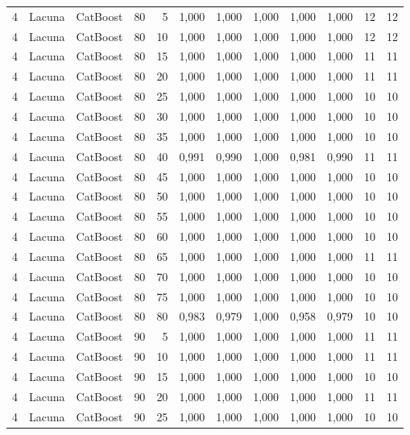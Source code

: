 \begin{longtable}{@{}rllrrrrrrrrr@{}}
4 & Lacuna & CatBoost & 80 & 5 & 1,000 & 1,000 & 1,000 & 1,000 & 1,000 & 12 & 12 \\
4 & Lacuna & CatBoost & 80 & 10 & 1,000 & 1,000 & 1,000 & 1,000 & 1,000 & 12 & 12 \\
4 & Lacuna & CatBoost & 80 & 15 & 1,000 & 1,000 & 1,000 & 1,000 & 1,000 & 11 & 11 \\
4 & Lacuna & CatBoost & 80 & 20 & 1,000 & 1,000 & 1,000 & 1,000 & 1,000 & 11 & 11 \\
4 & Lacuna & CatBoost & 80 & 25 & 1,000 & 1,000 & 1,000 & 1,000 & 1,000 & 10 & 10 \\
4 & Lacuna & CatBoost & 80 & 30 & 1,000 & 1,000 & 1,000 & 1,000 & 1,000 & 10 & 10 \\
4 & Lacuna & CatBoost & 80 & 35 & 1,000 & 1,000 & 1,000 & 1,000 & 1,000 & 10 & 10 \\
4 & Lacuna & CatBoost & 80 & 40 & 0,991 & 0,990 & 1,000 & 0,981 & 0,990 & 11 & 11 \\
4 & Lacuna & CatBoost & 80 & 45 & 1,000 & 1,000 & 1,000 & 1,000 & 1,000 & 10 & 10 \\
4 & Lacuna & CatBoost & 80 & 50 & 1,000 & 1,000 & 1,000 & 1,000 & 1,000 & 10 & 10 \\
4 & Lacuna & CatBoost & 80 & 55 & 1,000 & 1,000 & 1,000 & 1,000 & 1,000 & 10 & 10 \\
4 & Lacuna & CatBoost & 80 & 60 & 1,000 & 1,000 & 1,000 & 1,000 & 1,000 & 10 & 10 \\
4 & Lacuna & CatBoost & 80 & 65 & 1,000 & 1,000 & 1,000 & 1,000 & 1,000 & 11 & 11 \\
4 & Lacuna & CatBoost & 80 & 70 & 1,000 & 1,000 & 1,000 & 1,000 & 1,000 & 10 & 10 \\
4 & Lacuna & CatBoost & 80 & 75 & 1,000 & 1,000 & 1,000 & 1,000 & 1,000 & 10 & 10 \\
4 & Lacuna & CatBoost & 80 & 80 & 0,983 & 0,979 & 1,000 & 0,958 & 0,979 & 10 & 10 \\
4 & Lacuna & CatBoost & 90 & 5 & 1,000 & 1,000 & 1,000 & 1,000 & 1,000 & 11 & 11 \\
4 & Lacuna & CatBoost & 90 & 10 & 1,000 & 1,000 & 1,000 & 1,000 & 1,000 & 11 & 11 \\
4 & Lacuna & CatBoost & 90 & 15 & 1,000 & 1,000 & 1,000 & 1,000 & 1,000 & 10 & 10 \\
4 & Lacuna & CatBoost & 90 & 20 & 1,000 & 1,000 & 1,000 & 1,000 & 1,000 & 11 & 11 \\
4 & Lacuna & CatBoost & 90 & 25 & 1,000 & 1,000 & 1,000 & 1,000 & 1,000 & 10 & 10 \\

\end{longtable}
